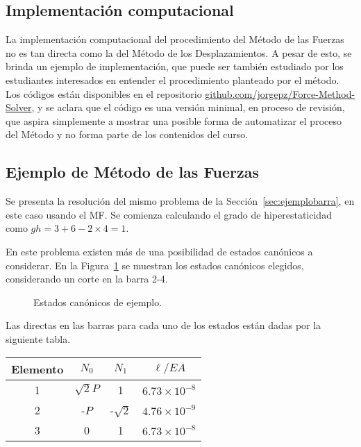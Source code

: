 \subsection{Implementación computacional}

La implementación computacional del procedimiento del Método de las Fuerzas no es tan directa como la del Método de los Desplazamientos. %
%
A pesar de esto, se brinda un ejemplo de implementación, que puede ser también estudiado por los estudiantes interesados en entender el procedimiento planteado por el método. %
%
Los códigos están disponibles en el repositorio \href{https://github.com/jorgepz/Force-Method-Solver}{github.com/jorgepz/Force-Method-Solver}, y se aclara que el código es una versión minimal, en proceso de revisión, que aspira simplemente a mostrar una posible forma de automatizar el proceso del Método y  no forma parte de los contenidos del curso. %
%



\subsection{Ejemplo de Método de las Fuerzas}

Se presenta la resolución del mismo problema de la Sección~\ref{sec:ejemplobarra}, en este caso usando el MF. %
%
Se comienza calculando el grado de hiperestaticidad como $gh= 3 + 6 - 2 \times 4 = 1$.


En este problema existen más de una posibilidad de estados canónicos a considerar. En la Figura~\ref{fig:hipereje} se muestran los estados canónicos elegidos, considerando un corte en la barra 2-4.

\begin{figure}[htb]
\centering
\def\svgwidth{\textwidth}

\caption{Estados canónicos de ejemplo.}
\label{fig:hipereje}
\end{figure}

Las directas en las barras para cada uno de los estados están dadas por la siguiente tabla.
	\begin{center}
		\begin{tabular}{cccc}
\hline
			Elemento & $N_0$ &  $N_1$ & $ \ell / E A$ \\
			\hline
			1 & $\sqrt{2} P$ & 1 & $6.73 \times 10^{-8}$ \\
			2 & -$P$ & -$\sqrt{2}$ & $4.76 \times 10^{-9}$ \\
			3 & 0 &  1 & $ 6.73 \times 10^{-8}$ \\
			\hline
		\end{tabular}
	\end{center}

